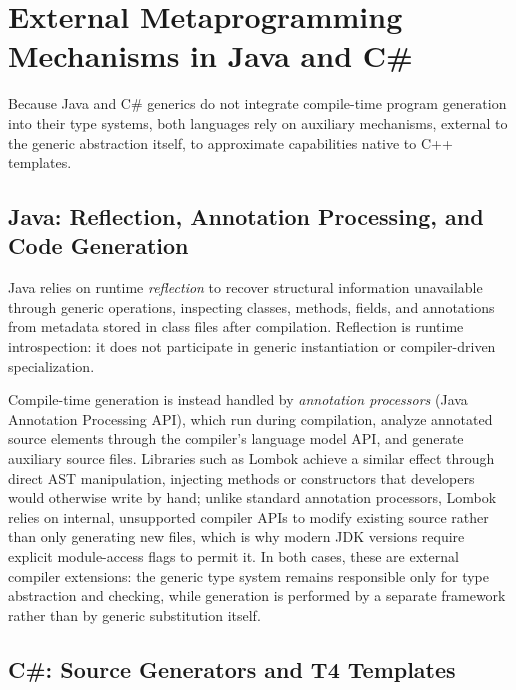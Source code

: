 \documentclass[11pt]{report}
\begin{document}

\section{External Metaprogramming Mechanisms in Java and C\#}
\label{Metaprogramming:ExternalMechanisms}

Because Java and C\# generics do not integrate compile-time program
generation into their type systems, both languages rely on auxiliary
mechanisms, external to the generic abstraction itself, to approximate
capabilities native to C++ templates.


\subsection{Java: Reflection, Annotation Processing, and Code Generation}
\label{Metaprogramming:ExternalMechanisms:Java}

Java relies on runtime \emph{reflection} to recover structural information
unavailable through generic operations, inspecting classes, methods,
fields, and annotations from metadata stored in class files after
compilation. Reflection is runtime introspection: it does not participate
in generic instantiation or compiler-driven specialization.

Compile-time generation is instead handled by \emph{annotation processors}
(Java Annotation Processing API), which run during compilation, analyze
annotated source elements through the compiler's language model API, and
generate auxiliary source files. Libraries such as Lombok achieve a
similar effect through direct AST manipulation, injecting methods or
constructors that developers would otherwise write by hand; unlike
standard annotation processors, Lombok relies on internal, unsupported
compiler APIs to modify existing source rather than only generating new
files, which is why modern JDK versions require explicit module-access
flags to permit it. In both cases, these are external compiler
extensions: the generic type system remains responsible only for type
abstraction and checking, while generation is performed by a separate
framework rather than by generic substitution itself.

\subsection{C\#: Source Generators and T4 Templates}
\end{document}
